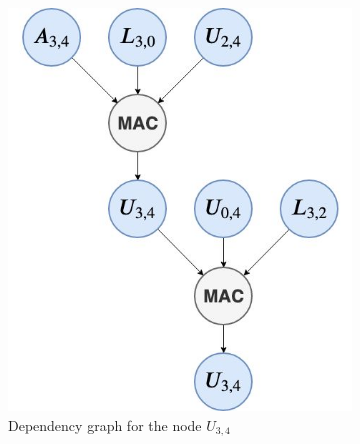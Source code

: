 \begin{figure}
    \centering
    \begin{subfigure}[t]{0.32\textwidth}
        \centering
        \includegraphics[width = \textwidth]{./Scheduler/macNode1.jpg}
        \caption{Dependency graph for the node $U_{3,4}$}
        \label{fig:sym:example:mac0}
    \end{subfigure}
    \hfill
    \begin{subfigure}[t]{0.32\textwidth}
        \centering

\end{subfigure}
\end{figure}
